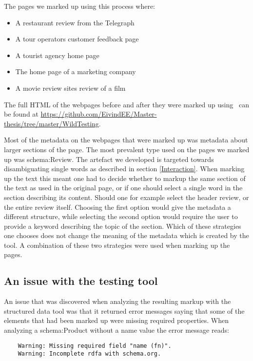 The pages we marked up using this process where:
\begin{itemize}
	\item A restaurant review from the Telegraph
	\item A tour operators customer feedback page
	\item A tourist agency home page
	\item The home page of a marketing company
	\item A movie review sites review of a film
\end{itemize}

The full HTML of the webpages before and after they were marked up using \theartefact\ can be found at
\url{https://github.com/EivindEE/Master-thesis/tree/master/WildTesting}.

Most of the metadata on the webpages that were marked up was metadata about larger sections of the page.
The most prevalent type used on the pages we marked up was schema:Review.
The artefact we developed is targeted towards disambiguating single words as described in section \ref{Interaction}.
When marking up the text this meant one had to decide whether to markup the same section of the text as used in the original page,
or if one should select a single word in the section describing its content.
Should one for example select the header review, or the entire review itself.
Choosing the first option would give the metadata a different structure,
while selecting the second option would require the user to provide a keyword describing the topic of the section.
Which of these strategies one chooses does not change the meaning of the metadata which is created by the tool.
A combination of these two strategies were used when marking up the pages.

\subsection{An issue with the testing tool}
An issue that was discovered when analyzing the resulting markup with the structured data tool was that
it returned  error messages saying that some of the elements that had been marked up were missing required properties.
When analyzing a schema:Product without a name value the error message reads:

\begin{verbatim}
	Warning: Missing required field "name (fn)".
	Warning: Incomplete rdfa with schema.org.
\end{verbatim}

